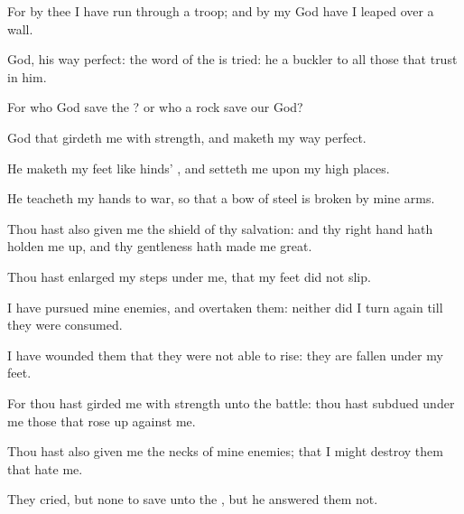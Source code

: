 {\Q {}For by thee I have run
through a
troop; and by my
God have I leaped
over a
wall.


\par }{\Q {}
God, his
way
{}
perfect: the
word of the
{} is
tried: he
{} a
buckler to all those that
trust in him.


\par }{\Q {}For who
{}
God
save the
{}? or who
{} a
rock
save our
God?


\par }{\Q {}
God that
girdeth me with
strength, and
maketh my
way
perfect.


\par }{\Q {}He
maketh my
feet like
hinds’
{}, and
setteth me upon my high
places.


\par }{\Q {}He
teacheth my
hands to
war, so that a
bow of
steel is
broken by mine
arms.


\par }{\Q {}Thou hast also
given me the
shield of thy
salvation: and thy right
hand hath holden me
up, and thy
gentleness hath made me
great.


\par }{\Q {}Thou hast
enlarged my
steps under me, that my
feet did not
slip.


\par }{\Q {}I have
pursued mine
enemies, and
overtaken them: neither did I turn
again till they were
consumed.


\par }{\Q {}I have
wounded them that they were not
able to
rise: they are
fallen under my
feet.


\par }{\Q {}For thou hast
girded me with
strength unto the
battle: thou hast
subdued under me those that rose
up against me.


\par }{\Q {}Thou hast also
given me the
necks of mine
enemies; that I might
destroy them that
hate me.


\par }{\Q {}They
cried, but
{} none to
save
{} unto the
{}, but he
answered them not.


}
